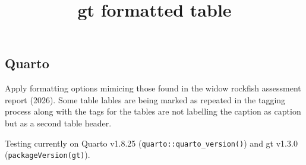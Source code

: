 \documentclass[
  letterpaper,
  DIV=11,
  numbers=noendperiod]{scrartcl}
\title{gt formatted table}
\author{}
\date{}
\begin{document}
\maketitle


\subsection{Quarto}\label{quarto}

Apply formatting options mimicing those found in the widow rockfish
assessment report (2026). Some table lables are being marked as repeated
in the tagging process along with the tags for the tables are not
labelling the caption as caption but as a second table header.

Testing currently on Quarto v1.8.25 (\texttt{quarto::quarto\_version()})
and gt v1.3.0
(\texttt{packageVersion(\textquotesingle{}gt\textquotesingle{})}).

\begingroup
\end{document}

